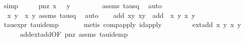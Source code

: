 \begin{isabellebody}
\ simp\isanewline
\ \ \isamarkupfalse%
\ \isamarkupfalse%
\ p{\isacharunderscore}nz{\isacharcolon}\ {\isachardoublequoteopen}x{}{\isacharprime}\ {\isasymnoteq}\ {}{\isachardoublequoteclose}\ {\isachardoublequoteopen}y{}{\isacharprime}\ {\isasymnoteq}\ {}{\isachardoublequoteclose}\ \isanewline
\ \ \ \ \isamarkupfalse%
\ assms{\isacharparenleft}{}{\isacharparenright}\ tau{\isacharunderscore}sq\ \isamarkupfalse%
\ auto{\isacharbrackleft}{}{\isacharbrackright}\isanewline
\ \ \ \ \isamarkupfalse%
\ {\isacartoucheopen}{\isasymtau}\ {\isacharparenleft}x{}{\isacharcomma}\ y{}{\isacharparenright}\ {\isacharequal}\ {\isacharparenleft}x{}{\isacharprime}{\isacharcomma}\ y{}{\isacharprime}{\isacharparenright}{\isacartoucheclose}\ assms{\isacharparenleft}{}{\isacharparenright}\ tau{\isacharunderscore}sq\ \isamarkupfalse%
\ auto\isanewline
\ \ \isamarkupfalse%
\ {\isachardoublequoteopen}add\ {\isacharparenleft}x{}{\isacharcomma}y{}{\isacharparenright}\ {\isacharparenleft}x{}{\isacharcomma}y{}{\isacharparenright}\ {\isacharequal}\ add\ {\isacharparenleft}{\isasymtau}\ {\isacharparenleft}x{}{\isacharprime}{\isacharcomma}\ y{}{\isacharprime}{\isacharparenright}{\isacharparenright}\ {\isacharparenleft}x{}{\isacharcomma}\ y{}{\isacharparenright}{\isachardoublequoteclose}\isanewline
\ \ \ \ \isamarkupfalse%
\ tau{\isacharunderscore}expr\ tau{\isacharunderscore}idemp\ \isanewline
\ \ \ \ \isamarkupfalse%
\ {\isacharparenleft}metis\ comp{\isacharunderscore}apply\ id{\isacharunderscore}apply{\isacharparenright}\isanewline
\ \ \isamarkupfalse%
\ \isamarkupfalse%
\ {\isachardoublequoteopen}{\isachardot}{\isachardot}{\isachardot}\ {\isacharequal}\ {\isasymtau}\ {\isacharparenleft}ext{\isacharunderscore}add\ {\isacharparenleft}x{}{\isacharprime}{\isacharcomma}\ y{}{\isacharprime}{\isacharparenright}\ {\isacharparenleft}x{}{\isacharcomma}\ y{}{\isacharparenright}{\isacharparenright}{\isachardoublequoteclose}\isanewline
\ \ \ \ \isamarkupfalse%
\ add{\isacharunderscore}ext{\isacharunderscore}add{\isacharbrackleft}OF\ p{\isacharunderscore}nz\ assms{\isacharparenleft}{}{\isacharcomma}{}{\isacharparenright}{\isacharbrackright}\ tau{\isacharunderscore}idemp\ \isamarkupfalse%

\end{isabellebody}
